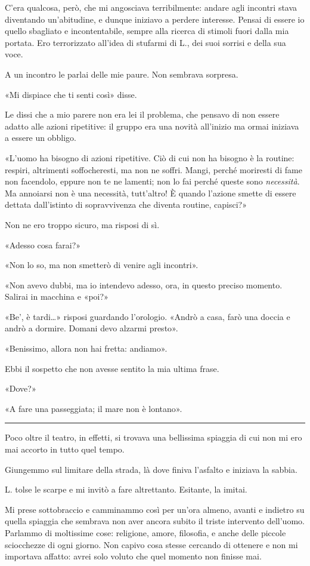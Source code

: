 C'era qualcosa, però, che mi angosciava terribilmente: andare agli incontri stava diventando
un'abitudine, e dunque iniziavo a perdere interesse. Pensai di essere io quello sbagliato e
incontentabile, sempre alla ricerca di stimoli fuori dalla mia portata. Ero terrorizzato all'idea di
stufarmi di L., dei suoi sorrisi e della sua voce.

A un incontro le parlai delle mie paure. Non sembrava sorpresa.

«Mi dispiace che ti senti così» disse.

Le dissi che a mio parere non era lei il problema, che pensavo di non essere adatto alle azioni
ripetitive: il gruppo era una novità all'inizio ma ormai iniziava a essere un obbligo.

«L'uomo ha bisogno di azioni ripetitive. Ciò di cui non ha bisogno è la routine: respiri, altrimenti
soffocheresti, ma non ne soffri. Mangi, perché moriresti di fame non facendolo, eppure non te ne
lamenti; non lo fai perché queste sono \emph{necessità}. Ma annoiarsi non è una necessità,
tutt'altro! È quando l'azione smette di essere dettata dall'istinto di sopravvivenza che diventa
routine, capisci?»

Non ne ero troppo sicuro, ma risposi di sì.

«Adesso cosa farai?»

«Non lo so, ma non smetterò di venire agli incontri».

«Non avevo dubbi, ma io intendevo adesso, ora, in questo preciso momento. Salirai in macchina e
«poi?»

«Be', è tardi\dots{}»  risposi guardando l'orologio. «Andrò a casa, farò una doccia e andrò a
dormire. Domani devo alzarmi presto».

«Benissimo, allora non hai fretta: andiamo».

Ebbi il sospetto che non avesse sentito la mia ultima frase.

«Dove?»

«A fare una passeggiata; il mare non è lontano».

\plainbreak{1}

Poco oltre il teatro, in effetti, si trovava una bellissima spiaggia di cui non mi ero mai accorto
in tutto quel tempo.

Giungemmo sul limitare della strada, là dove finiva l'asfalto e iniziava la sabbia.

L. tolse le scarpe e mi invitò a fare altrettanto. Esitante, la imitai.

Mi prese sottobraccio e camminammo così per un'ora almeno, avanti e indietro su quella spiaggia che
sembrava non aver ancora subito il triste intervento dell'uomo. Parlammo di moltissime cose:
religione, amore, filosofia, e anche delle piccole sciocchezze di ogni giorno. Non capivo cosa
stesse cercando di ottenere e non mi importava affatto: avrei solo voluto che quel momento non
finisse mai.

